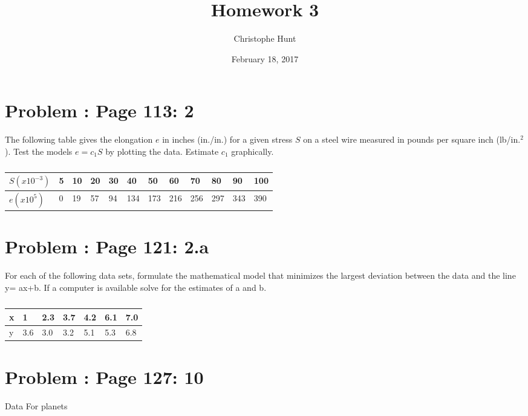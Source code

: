 \documentclass[]{article}
\title{Homework 3}
\author{Christophe Hunt}
\date{February 18, 2017}
\begin{document}
\maketitle

{
\setcounter{tocdepth}{2}
\tableofcontents
}
\section{Problem : Page 113: 2}\label{problem-page-113-2}

The following table gives the elongation \(e\) in inches (in./in.) for a
given stress \(S\) on a steel wire measured in pounds per square inch
(lb/in.\(^2\)). Test the models \(e = c_1S\) by plotting the data.
Estimate \(c_1\) graphically.

\begin{table}[!htbp]
\centering
\caption{}
\label{my-label}
\begin{tabular}{l|lllllllllll}
$S(x10^{-3})$ & 5 & 10 & 20 & 30 & 40  & 50  & 60  & 70  & 80  & 90  & 100 \\ \hline
$e(x10^5)$    & 0 & 19 & 57 & 94 & 134 & 173 & 216 & 256 & 297 & 343 & 390 
\end{tabular}
\end{table}

\section{Problem : Page 121: 2.a}\label{problem-page-121-2.a}

For each of the following data sets, formulate the mathematical model
that minimizes the largest deviation between the data and the line y=
ax+b. If a computer is available solve for the estimates of a and b.

\begin{table}[!htbp]
\centering
\caption{}
\label{my-label}
\begin{tabular}{l|llllll}
x & 1   & 2.3 & 3.7 & 4.2 & 6.1 & 7.0 \\ \hline
y & 3.6 & 3.0 & 3.2 & 5.1 & 5.3 & 6.8  
\end{tabular}
\end{table}

\section{Problem : Page 127: 10}\label{problem-page-127-10}

Data For planets
\end{document}
